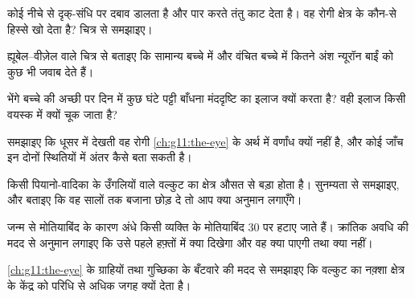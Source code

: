 \begin{exercise}[$\star\star$]\label{exo:g11:vision-and-brain:7}
कोई  नीचे से दृक्-संधि पर दबाव डालता है और पार करते तंतु काट देता है।
वह रोगी क्षेत्र के कौन-से हिस्से खो देता है? चित्र से समझाइए।
\end{exercise}

\begin{exercise}[$\star\star$]\label{exo:g11:vision-and-brain:8}
ह्यूबेल--वीज़ेल वाले चित्र से बताइए कि सामान्य बच्चे में और वंचित बच्चे में
कितने अंश न्यूरॉन बाईं  को कुछ भी जवाब देते हैं।
\end{exercise}

\begin{exercise}[$\star\star$]\label{exo:g11:vision-and-brain:9}
भेंगे बच्चे की अच्छी  पर दिन में कुछ घंटे पट्टी बाँधना मंददृष्टि का इलाज
क्यों करता है? वही इलाज किसी वयस्क में क्यों चूक जाता है?
\end{exercise}

\begin{exercise}[$\star\star$]\label{exo:g11:vision-and-brain:10}
समझाइए कि धूसर में देखती वह रोगी \cref{ch:g11:the-eye} के अर्थ में वर्णांध
क्यों नहीं है, और कोई जाँच इन दोनों स्थितियों में अंतर कैसे बता सकती है।
\end{exercise}

\begin{exercise}[$\star\star$]\label{exo:g11:vision-and-brain:11}
किसी पियानो-वादिका के उँगलियों वाले वल्कुट का क्षेत्र औसत से बड़ा होता है।
सुनम्यता से समझाइए, और बताइए कि वह सालों तक बजाना छोड़ दे तो आप क्या
अनुमान लगाएँगे।
\end{exercise}

\begin{exercise}[$\star\star\star$]\label{exo:g11:vision-and-brain:12}
जन्म से मोतियाबिंद के कारण अंधे किसी व्यक्ति के मोतियाबिंद 30 पर हटाए जाते
हैं। क्रांतिक अवधि की मदद से अनुमान लगाइए कि उसे पहले हफ़्तों में क्या
दिखेगा और वह क्या पाएगी तथा क्या नहीं।
\end{exercise}

\begin{exercise}[$\star\star\star$]\label{exo:g11:vision-and-brain:13}
\cref{ch:g11:the-eye} के ग्राहियों तथा गुच्छिका  के बँटवारे की मदद
से समझाइए कि वल्कुट का नक़्शा क्षेत्र के केंद्र को परिधि से अधिक जगह क्यों
देता है।
\end{exercise}

